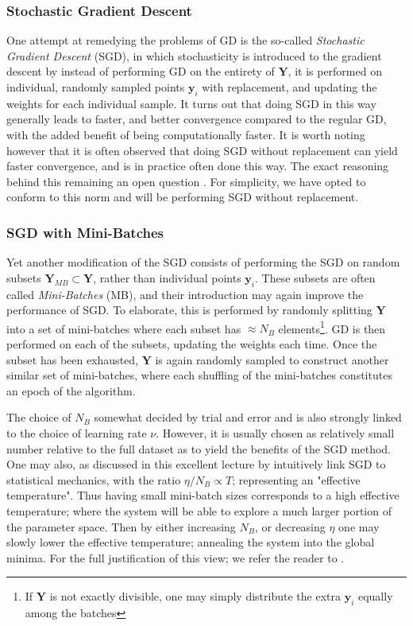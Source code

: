 \documentclass[reprint, english, nofootinbib]{revtex4-2}
\begin{document}
\subsubsection{Stochastic Gradient Descent}
\noindent
One attempt at remedying the problems of GD is the so-called \textit{Stochastic Gradient Descent} (SGD), in which stochasticity is introduced to the gradient descent by instead of performing GD on the entirety of $\pmb Y$, it is performed on individual, randomly sampled points $\pmb y_i$ with replacement, and updating the weights for each individual sample.
It turns out that doing SGD in this way generally leads to faster, and better convergence compared to the regular GD, with the added benefit of being computationally faster. It is worth noting however that it is often observed that doing SGD without replacement can yield faster convergence, and is in practice often done this way. The exact reasoning behind this remaining an open question \cite{shamir2016withoutreplacement}\cite{pmlr-v97-nagaraj19a}. For simplicity, we have opted to conform to this norm and will be performing SGD without replacement.

\subsubsection{SGD with Mini-Batches\label{sect: SGD with mini-batches}}
\noindent
Yet another modification of the SGD consists of performing the SGD on random subsets $\pmb Y_{MB} \subset \pmb Y$, rather than individual points $\pmb y_i$. These subsets are often called \textit{Mini-Batches} (MB), and their introduction may again improve the performance of SGD. To elaborate, this is performed by randomly splitting $\pmb Y$ into a set of mini-batches where each subset has $\approx N_{B}$ elements\footnote{If $\pmb Y$ is not exactly divisible, one may simply distribute the extra $\pmb y_i$ equally among the batches}. GD is then performed on each of the subsets, updating the weights each time. Once the subset has been exhausted, $\pmb Y$ is again randomly sampled to construct another similar set of mini-batches, where each shuffling of the mini-batches constitutes an epoch of the algorithm.

The choice of $N_{B}$ somewhat decided by trial and error and is also strongly linked to the choice of learning rate $\nu$. However, it is usually chosen as relatively small number relative to the full dataset as to yield the benefits of the SGD method. One may also, as discussed in this excellent lecture by \textcite{ManyBodyML} intuitively link SGD to statistical mechanics, with the ratio $\eta / N_{B} \propto T$; representing an "effective temperature". Thus having small mini-batch sizes corresponds to a high effective temperature; where the system will be able to explore a much larger portion of the parameter space. Then by either increasing $N_B$, or decreasing $\eta$ one may slowly lower the effective temperature; annealing the system into the global minima. For the full justification of this view; we refer the reader to \textcite{ManyBodyML}.
\end{document}
